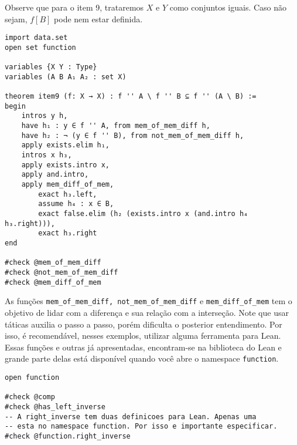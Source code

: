 \begin{theorem}[Item 9]
\end{theorem}

Observe que para o item 9, trataremos $X$ e $Y$ como conjuntos iguais. Caso
não sejam, $f[B]$ pode nem estar definida.

\begin{lstlisting}
import data.set
open set function

variables {X Y : Type}
variables (A B A₁ A₂ : set X)

theorem item9 (f: X → X) : f '' A \ f '' B ⊆ f '' (A \ B) :=
begin
    intros y h,
    have h₁ : y ∈ f '' A, from mem_of_mem_diff h,
    have h₂ : ¬ (y ∈ f '' B), from not_mem_of_mem_diff h,
    apply exists.elim h₁,
    intros x h₃,
    apply exists.intro x,
    apply and.intro,
    apply mem_diff_of_mem,
        exact h₃.left,
        assume h₄ : x ∈ B,
        exact false.elim (h₂ (exists.intro x (and.intro h₄ h₃.right))),
        exact h₃.right
end

#check @mem_of_mem_diff
#check @not_mem_of_mem_diff
#check @mem_diff_of_mem

\end{lstlisting}

As funções \lstinline{mem_of_mem_diff, not_mem_of_mem_diff} e
\lstinline{mem_diff_of_mem} tem o objetivo de lidar com a diferença e sua
relação com a interseção. Note que usar táticas auxilia o passo a passo, porém
dificulta o posterior entendimento. Por isso, é recomendável, nesses exemplos,
utilizar alguma ferramenta para Lean. Essas funções e outras já apresentadas,
encontram-se na biblioteca do Lean e grande parte delas está disponível quando
você abre o namespace \lstinline{function}.

\begin{lstlisting}
open function 

#check @comp 
#check @has_left_inverse
-- A right_inverse tem duas definicoes para Lean. Apenas uma
-- esta no namespace function. Por isso e importante especificar. 
#check @function.right_inverse    
\end{lstlisting}